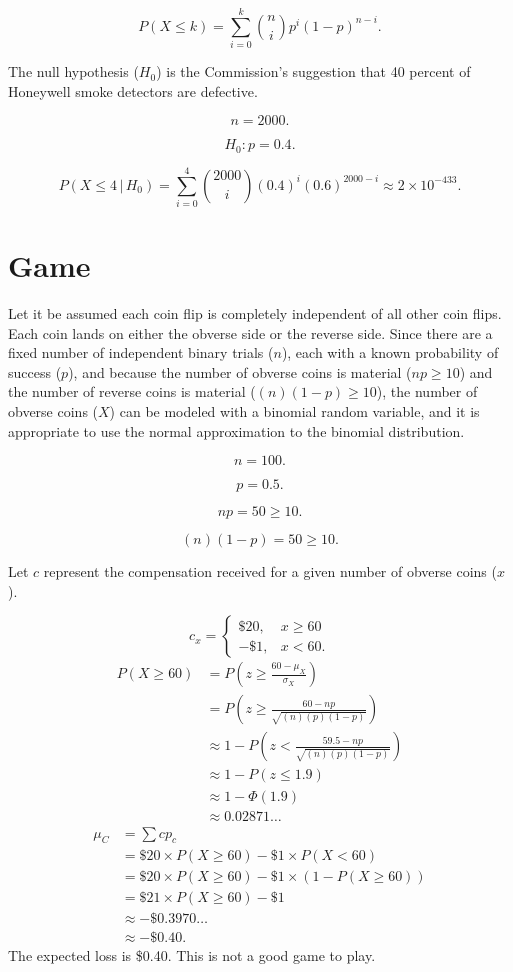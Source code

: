 \documentclass[12pt]{article}
\begin{document}
\[P(X\leq k)=\sum^{k}_{i=0}{\binom{n}{i}p^i(1-p)^{n-i}}.\]

The null hypothesis ($H_0$) is the Commission's suggestion that 40 percent of Honeywell smoke detectors are defective.

\[n=2000.\]

\[H_0: p=0.4.\]

\[P(X\leq 4\,|\,H_0)=\sum^{4}_{i=0}{\binom{2000}{i}(0.4)^i(0.6)^{2000-i}}\approx 2\times 10^{-433}.\]
\section{Game}
Let it be assumed each coin flip is completely independent of all other coin flips. Each coin lands on either the obverse side or the reverse side. Since there are a fixed number of independent binary trials ($n$), each with a known probability of success ($p$), and because the number of obverse coins is material ($np\geq 10$) and the number of reverse coins is material ($(n)(1-p)\geq 10$), the number of obverse coins ($X$) can be modeled with a binomial random variable, and it is appropriate to use the normal approximation to the binomial distribution.

\[n=100.\]

\[p=0.5.\]

\[np=50\geq 10.\]

\[(n)(1-p)=50\geq 10.\]

Let $c$ represent the compensation received for a given number of obverse coins ($x$).

\begin{equation*}
c_x=\begin{cases}
    \$20,&x\geq 60\\
    -\$1,&x<60.
\end{cases}
\end{equation*}
\begin{align*}
P(X\geq 60)
&=P\left(z\geq\frac{60-\mu_X}{\sigma_X}\right)\\
&=P\left(z\geq\frac{60-np}{\sqrt{(n)(p)(1-p)}}\right)\\
&\approx 1-P\left(z<\frac{59.5-np}{\sqrt{(n)(p)(1-p)}}\right)\\
&\approx 1-P(z\leq 1.9)\\
&\approx 1-\Phi(1.9)\\
&\approx 0.02871\dots
\end{align*}
\begin{align*}
\mu_C
&=\sum{cp_{c}}\\
&=\$20\times P(X\geq 60)-\$1\times P(X<60)\\
&=\$20\times P(X\geq 60)-\$1\times(1-P(X\geq 60))\\
&=\$21\times P(X\geq 60)-\$1\\
&\approx-\$0.3970\dots\\
&\approx-\$0.40.
\end{align*}
The expected loss is \$0.40. This is not a good game to play.
\end{document}
